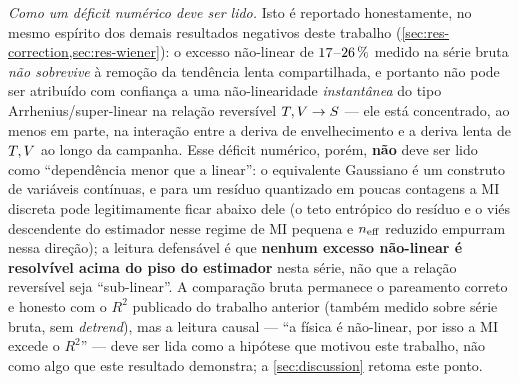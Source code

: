 \emph{Como um déficit numérico deve ser lido.} Isto é reportado
honestamente, no mesmo espírito dos demais resultados negativos deste
trabalho (\cref{sec:res-correction,sec:res-wiener}): o excesso não-linear de
$17$--$26\,\%$ medido na série bruta
\emph{não sobrevive} à remoção da tendência lenta compartilhada, e portanto
não pode ser atribuído com confiança a uma não-linearidade
\emph{instantânea} do tipo Arrhenius/super-linear na relação reversível
$T,V\to S$ --- ele está concentrado, ao menos em parte, na
interação entre a deriva de envelhecimento e a deriva lenta de
$T,V$ ao longo da campanha. Esse déficit numérico, porém,
\textbf{não} deve ser lido como ``dependência menor que a linear'': o
equivalente Gaussiano é um construto de variáveis contínuas, e para um
resíduo quantizado em poucas contagens a MI discreta pode legitimamente
ficar abaixo dele (o teto entrópico do resíduo e o viés
descendente do estimador nesse regime de MI pequena e $n_{\mathrm{eff}}$ reduzido
empurram nessa direção); a leitura defensável é que \textbf{nenhum excesso
não-linear é resolvível acima do piso do estimador} nesta série, não que a
relação reversível seja ``sub-linear''. A comparação bruta permanece o
pareamento correto e honesto com o $R^2$ publicado do trabalho anterior
(também medido sobre série bruta, sem \emph{detrend}), mas a leitura causal
--- ``a física é não-linear, por isso a MI excede o $R^2$'' --- deve ser
lida como a hipótese que motivou este trabalho, não como algo que este
resultado demonstra; a \cref{sec:discussion} retoma este ponto.

